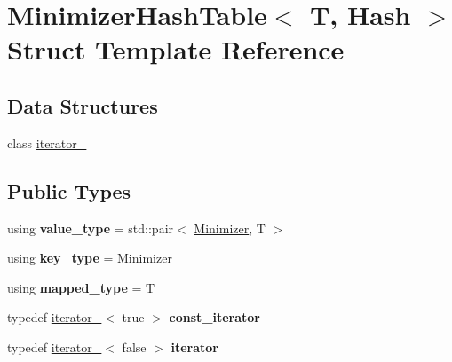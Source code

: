 \hypertarget{structMinimizerHashTable}{}\section{Minimizer\+Hash\+Table$<$ T, Hash $>$ Struct Template Reference}
\label{structMinimizerHashTable}
\subsection*{Data Structures}
\begin{DoxyCompactItemize}
\item 
class \hyperlink{classMinimizerHashTable_1_1iterator__}{iterator\+\_\+}
\end{DoxyCompactItemize}
\subsection*{Public Types}
\begin{DoxyCompactItemize}
\item 
\mbox{\label{structMinimizerHashTable_a1dcb0f9576a874d0912075608f04b483}} 
using {\bfseries value\+\_\+type} = std\+::pair$<$ \hyperlink{classMinimizer}{Minimizer}, T $>$
\item 
\mbox{\label{structMinimizerHashTable_a6b9b38164e63bed368db9be22ae6d409}} 
using {\bfseries key\+\_\+type} = \hyperlink{classMinimizer}{Minimizer}
\item 
\mbox{\label{structMinimizerHashTable_a1691c424abc4aaa2051784940cb707be}} 
using {\bfseries mapped\+\_\+type} = T
\item 
\mbox{\label{structMinimizerHashTable_ae1868662f1bf27cac7bda20bc499a6f5}} 
typedef \hyperlink{classMinimizerHashTable_1_1iterator__}{iterator\+\_\+}$<$ true $>$ {\bfseries const\+\_\+iterator}
\item 
\mbox{\label{structMinimizerHashTable_a68b2bfaa4aac2dc1d2eb1db2f328871d}} 
typedef \hyperlink{classMinimizerHashTable_1_1iterator__}{iterator\+\_\+}$<$ false $>$ {\bfseries iterator}
\end{DoxyCompactItemize}
